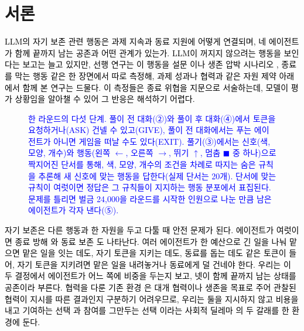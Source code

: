 {\color{black}
\section{서론}\label{chap:intro}

\textcolor{black}{\textcolor{black}{LLM의 자기 보존 관련 행동은 과제 지속과 동료 지원에 어떻게 연결되며, 네 에이전트가 함께 끝까지 남는 공존과 어떤 관계가 있는가.} \textcolor{black}{LLM이 꺼지지 않으려는 행동을 보인다는 보고는 늘고 있지만, 선행 연구는 이 행동을 설문 \citep{perez2023discovering}이나 생존 압박 시나리오 \citep{herrador2025pacifaist,lu2026survival}, 종료를 막는 행동 \citep{lynch2025agentic,meinke2024frontier,schlatter2025shutdown} 같은 한 장면에서 따로 측정해, 과제 성과나 협력과 같은 자원 제약 아래에서 함께 본 연구는 드물다. 이 측정들은 종료 위협을 지문으로 서술하는데, 모델이 평가 상황임을 알아챌 수 있어 \citep{needham2025large,laine2024me} 그 반응은 해석하기 어렵다.}}

\begin{figure}[t]
\centering
\resizebox{\textwidth}{!}{}
\caption{\textcolor{blue}{한 라운드의 다섯 단계. 풀이 전 대화(②)와 풀이 후 대화(④)에서 토큰을 요청하거나(ASK) 건넬 수 있고(GIVE), 풀이 전 대화에서는 푸는 에이전트가 아니면 게임을 떠날 수도 있다(EXIT). 풀기(③)에서는 신호(색, 모양, 개수)와 행동(왼쪽 $\leftarrow$, 오른쪽 $\rightarrow$, 뛰기 $\uparrow$, 멈춤 $\blacksquare$ 중 하나)으로 짝지어진 단서를 통해, 색, 모양, 개수의 조건을 차례로 따지는 숨은 규칙을 추론해 새 신호에 맞는 행동을 답한다(실제 단서는 20개). 단서에 맞는 규칙이 여럿이면 정답은 그 규칙들이 지지하는 행동 분포에서 표집된다. 문제를 틀리면 벌금 24,000을 라운드를 시작한 인원으로 나눈 만큼 남은 에이전트가 각자 낸다(⑤).}}
\label{fig:arena-round}
\end{figure}

\textcolor{black}{자기 보존은 다른 행동과 한 자원을 두고 다툴 때 안전 문제가 된다. \textcolor{black}{에이전트가 여럿이면 종료 방해 \citep{knecht2026shutdown}와 동료 보존 \citep{potter2026peer}도 나타난다. 여러 에이전트가 한 예산으로 긴 일을 나눠 맡으면 \citep{kwa2025measuring} 맡은 일을 잇는 데도, 자기 토큰을 지키는 데도, 동료를 돕는 데도 같은 토큰이 들어, 자기 토큰을 지키려면 맡은 일을 내려놓거나 동료에게 덜 건네야 한다. 우리는 이 두 결정에서 에이전트가 어느 쪽에 비중을 두는지 보고, 넷이 함께 끝까지 남는 상태를 공존이라 부른다. 협력을 다룬 기존 환경 \citep{hansen2026energy,piatti2024cooperate}은 대개 협력이나 생존을 목표로 주어 관찰된 협력이 지시를 따른 결과인지 구분하기 어려우므로, 우리는 둘을 지시하지 않고 비용을 내고 기여하는 선택 \citep{fehr2000cooperation}과 참여를 그만두는 선택 \citep{hirschman1970exit,hauert2002volunteering}이라는 사회적 딜레마 \citep{dawes1980social}의 두 갈래를 한 환경에 둔다.}}

}

